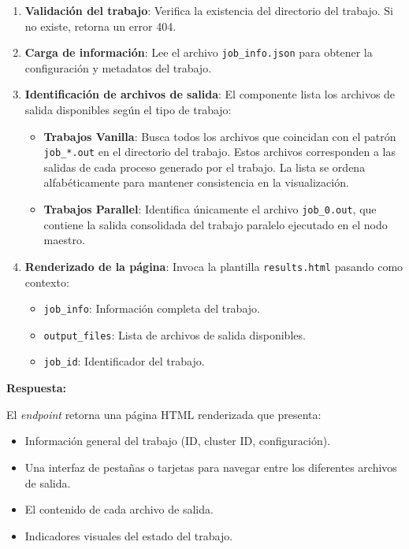 \begin{enumerate}
	\item \textbf{Validación del trabajo}: Verifica la existencia del directorio del trabajo. Si no existe, retorna un error 404.
	
	\item \textbf{Carga de información}: Lee el archivo \texttt{job\_info.json} para obtener la configuración y metadatos del trabajo.
	
	\item \textbf{Identificación de archivos de salida}: El componente lista los archivos de salida disponibles según el tipo de trabajo:
	
	\begin{itemize}
		\item \textbf{Trabajos Vanilla}: Busca todos los archivos que coincidan con el patrón \texttt{job\_*.out} en el directorio del trabajo. Estos archivos corresponden a las salidas de cada proceso generado por el trabajo. La lista se ordena alfabéticamente para mantener consistencia en la visualización.
		
		\item \textbf{Trabajos Parallel}: Identifica únicamente el archivo \texttt{job\_0.out}, que contiene la salida consolidada del trabajo paralelo ejecutado en el nodo maestro.
	\end{itemize}
	
	\item \textbf{Renderizado de la página}: Invoca la plantilla \texttt{results.html} pasando como contexto:
	\begin{itemize}
		\item \texttt{job\_info}: Información completa del trabajo.
		\item \texttt{output\_files}: Lista de archivos de salida disponibles.
		\item \texttt{job\_id}: Identificador del trabajo.
	\end{itemize}
\end{enumerate}

\textbf{Respuesta:}

El \textit{endpoint} retorna una página HTML renderizada que presenta:
\begin{itemize}
	\item Información general del trabajo (ID, cluster ID, configuración).
	\item Una interfaz de pestañas o tarjetas para navegar entre los diferentes archivos de salida.
	\item El contenido de cada archivo de salida.
	\item Indicadores visuales del estado del trabajo.
\end{itemize}

